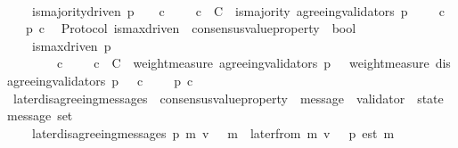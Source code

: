\begin{isabellebody}
\ \ \isanewline
\ \ \ \ {\isachardoublequoteopen}is{\isacharunderscore}majority{\isacharunderscore}driven\ p\ {\isacharequal}\ {\isacharparenleft}{\isasymforall}\ {\isasymsigma}\ c{\isachardot}\ {\isasymsigma}\ {\isasymin}\ {\isasymSigma}\ {\isasymand}\ c\ {\isasymin}\ C\ {\isasymand}\ is{\isacharunderscore}majority\ {\isacharparenleft}agreeing{\isacharunderscore}validators\ {\isacharparenleft}p{\isacharcomma}\ {\isasymsigma}{\isacharparenright}{\isacharcomma}\ {\isasymsigma}{\isacharparenright}\ {\isasymlongrightarrow}\ {\isacharparenleft}{\isasymforall}\ c\ {\isasymin}\ {\isasymepsilon}\ {\isasymsigma}{\isachardot}\ p\ c{\isacharparenright}{\isacharparenright}{\isachardoublequoteclose}\isanewline
\isanewline
\isanewline
{}\isamarkupfalse%
\ {\isacharparenleft}\ Protocol{\isacharparenright}\ is{\isacharunderscore}max{\isacharunderscore}driven\ {\isacharcolon}{\isacharcolon}\ {\isachardoublequoteopen}consensus{\isacharunderscore}value{\isacharunderscore}property\ {\isasymRightarrow}\ bool{\isachardoublequoteclose}\isanewline
\ \ \isanewline
\ \ \ \ {\isachardoublequoteopen}is{\isacharunderscore}max{\isacharunderscore}driven\ p\ {\isacharequal}\isanewline
\ \ \ \ \ \ {\isacharparenleft}{\isasymforall}\ {\isasymsigma}\ c{\isachardot}\ {\isasymsigma}\ {\isasymin}\ {\isasymSigma}\ {\isasymand}\ c\ {\isasymin}\ C\ {\isasymand}\ weight{\isacharunderscore}measure\ {\isacharparenleft}agreeing{\isacharunderscore}validators\ {\isacharparenleft}p{\isacharcomma}\ {\isasymsigma}{\isacharparenright}{\isacharparenright}\ {\isachargreater}\ weight{\isacharunderscore}measure\ {\isacharparenleft}disagreeing{\isacharunderscore}validators\ {\isacharparenleft}p{\isacharcomma}\ {\isasymsigma}{\isacharparenright}{\isacharparenright}\ {\isasymlongrightarrow}\ c\ {\isasymin}\ {\isasymepsilon}\ {\isasymsigma}\ {\isasymand}\ p\ c{\isacharparenright}{\isachardoublequoteclose}\isanewline
\isanewline
\isanewline
{}\isamarkupfalse%
\ later{\isacharunderscore}disagreeing{\isacharunderscore}messages\ {\isacharcolon}{\isacharcolon}\ {\isachardoublequoteopen}{\isacharparenleft}consensus{\isacharunderscore}value{\isacharunderscore}property\ {\isacharasterisk}\ message\ {\isacharasterisk}\ validator\ {\isacharasterisk}\ state{\isacharparenright}\ {\isasymRightarrow}\ message\ set{\isachardoublequoteclose}\isanewline
\ \ \ \isanewline
\ \ \ \ {\isachardoublequoteopen}later{\isacharunderscore}disagreeing{\isacharunderscore}messages\ {\isacharparenleft}p{\isacharcomma}\ m{\isacharcomma}\ v{\isacharcomma}\ {\isasymsigma}{\isacharparenright}\ {\isacharequal}\ {\isacharbraceleft}m{\isacharprime}\ {\isasymin}\ later{\isacharunderscore}from\ {\isacharparenleft}m{\isacharcomma}\ v{\isacharcomma}\ {\isasymsigma}{\isacharparenright}{\isachardot}\ {\isasymnot}\ p\ {\isacharparenleft}est\ m{\isacharprime}{\isacharparenright}{\isacharbraceright}{\isachardoublequoteclose}\isanewline

\end{isabellebody}
